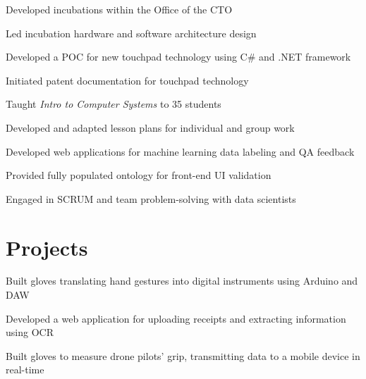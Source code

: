 \documentclass[]{resume-openfont}
\begin{document}
\begin{minipage}[t]{1\textwidth}
\begin{tightemize}
\item Developed incubations within the Office of the CTO
\item Led incubation hardware and software architecture design
\item Developed a POC for new touchpad technology using C\# and .NET framework
\item Initiated patent documentation for touchpad technology
\end{tightemize}
\sectionsep

\begin{tightemize}
\item Taught {\it Intro to Computer Systems} to 35 students
\item Developed and adapted lesson plans for individual and group work
\end{tightemize}
\sectionsep

\begin{tightemize}
\item Developed web applications for machine learning data labeling and QA feedback
\item Provided fully populated ontology for front-end UI validation
\item Engaged in SCRUM and team problem-solving with data scientists
\end{tightemize}
\sectionsep
\end{minipage}

\begin{minipage}[t]{1\textwidth}
\vspace{-4 mm}
\section{Projects}
\titlerule
\vspace{2.5 mm}

Built gloves translating hand gestures into digital instruments using Arduino and DAW
\sectionsep

Developed a web application for uploading receipts and extracting information using OCR
\sectionsep

Built gloves to measure drone pilots' grip, transmitting data to a mobile device in real-time
\sectionsep

\end{minipage} 
\end{document}
